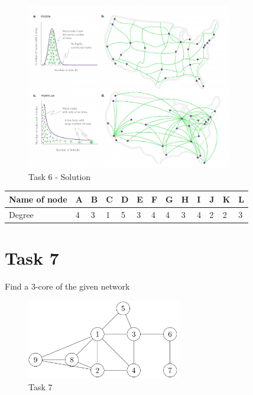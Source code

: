 \documentclass{cernatsnote}
\begin{document}
\begin{figure}[h]
\centering
\includegraphics[width=0.8\textwidth]{images/figure-4-6.jpg}
\caption{\label{fig:figure-4-6.jpg} Task 6 - Solution}
\end{figure}

\begin{table}[h!]
\begin{tabular}{|l|l|l|l|l|l|l|l|l|l|l|l|l|}
\hline
Name of node & A & B & C & D & E & F & G & H & I & J & K & L \\ \hline
Degree       & 4 & 3 & 1 & 5 & 3 & 4 & 4 & 3 & 4 & 2 & 2 & 3 \\ \hline
\end{tabular}
\end{table}

\section{Task 7} 
Find a 3-core of the given network
\begin{figure}[h!]
\centering
\includegraphics[width=0.6\textwidth]{images/task7.png}
\caption{\label{fig:task7} Task 7}
\end{figure}
\end{document}
